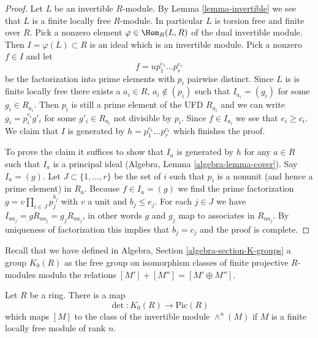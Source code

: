 \begin{proof}
Let $L$ be an invertible $R$-module. By Lemma \ref{lemma-invertible}
we see that $L$ is a finite locally free $R$-module. In particular
$L$ is torsion free and finite over $R$. Pick a nonzero element
$\varphi \in \Hom_R(L, R)$ of the dual invertible module.
Then $I = \varphi(L) \subset R$ is an ideal which is an invertible module.
Pick a nonzero $f \in I$ and let
$$
f = u p_1^{e_1} \ldots p_r^{e_r}
$$
be the factorization into prime elements with $p_i$ pairwise distinct.
Since $L$ is is finite locally free there exists a $a_i \in R$,
$a_i \not \in (p_i)$ such that $I_{a_i} = (g_i)$ for some $g_i \in R_{a_i}$.
Then $p_i$ is still a prime element of the UFD $R_{a_i}$ and
we can write $g_i = p_i^{c_i} g'_i$ for some $g'_i \in R_{a_i}$
not divisible by $p_i$. Since $f \in I_{a_i}$ we see that $e_i \geq c_i$.
We claim that $I$ is generated by $h = p_1^{c_1} \ldots p_r^{c_r}$ which
finishes the proof.

\medskip\noindent
To prove the claim it suffices to show that $I_a$ is generated by $h$
for any $a \in R$ such that $I_a$ is a principal ideal
(Algebra, Lemma \ref{algebra-lemma-cover}). Say $I_a = (g)$.
Let $J \subset \{1, \ldots, r\}$ be the set of $i$ such that
$p_i$ is a nonunit (and hence a prime element) in $R_a$. Because
$f \in I_a = (g)$ we find the prime factorization
$g = v \prod_{i \in J} p_j^{b_j}$
with $v$ a unit and $b_j \leq e_j$. For each $j \in J$ we have
$I_{aa_j} = g R_{aa_j} = g_j R_{aa_j}$, in other words
$g$ and $g_j$ map to associates in $R_{aa_j}$. By uniqueness
of factorization this implies that $b_j = c_j$ and the proof is complete.
\end{proof}

\noindent
Recall that we have defined in Algebra, Section \ref{algebra-section-K-groups}
a group $K_0(R)$ as the free group on isomorphism classes
of finite projective $R$-modules modulo the relations
$[M'] + [M''] = [M' \oplus M'']$.

\begin{lemma}
\label{lemma-det}
Let $R$ be a ring. There is a map
$$
\det : K_0(R) \longrightarrow \text{Pic}(R)
$$
which maps $[M]$ to the class of the invertible module
$\wedge^n(M)$ if $M$ is a finite locally free module of rank $n$.
\end{lemma}

